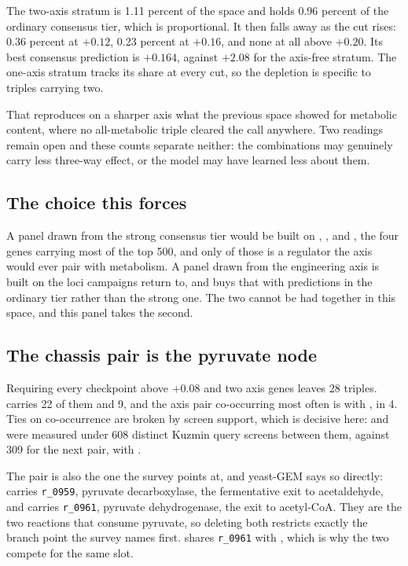 The two-axis stratum is 1.11 percent of the space and holds 0.96 percent of the
ordinary consensus tier, which is proportional. It then falls away as the cut
rises: 0.36 percent at $+0.12$, 0.23 percent at $+0.16$, and none at all above
$+0.20$. Its best consensus prediction is $+0.164$, against $+2.08$ for the
axis-free stratum. The one-axis stratum tracks its share at every cut, so the
depletion is specific to triples carrying two.

That reproduces on a sharper axis what the previous space showed for metabolic
content, where no all-metabolic triple cleared the call anywhere. Two readings
remain open and these counts separate neither: the combinations may genuinely
carry less three-way effect, or the model may have learned less about them.

\subsection{The choice this forces}

A panel drawn from the strong consensus tier would be built on ,
,  and , the four genes carrying most of the top
500, and only  of those is a regulator the axis would ever pair with
metabolism. A panel drawn from the engineering axis is built on the loci
campaigns return to, and buys that with predictions in the ordinary tier rather
than the strong one. The two cannot be had together in this space, and this
panel takes the second.

\subsection{The chassis pair is the pyruvate node}

Requiring every checkpoint above $+0.08$ and two axis genes leaves 28 triples.
 carries 22 of them and  9, and the axis pair co-occurring
most often is  with , in 4. Ties on co-occurrence are broken
by screen support, which is decisive here:  and  were
measured under 608 distinct Kuzmin query screens between them, against 309 for the
next pair,  with .

The pair is also the one the survey points at, and yeast-GEM says so directly:
 carries \texttt{r\_0959}, pyruvate decarboxylase, the fermentative
exit to acetaldehyde, and  carries \texttt{r\_0961}, pyruvate
dehydrogenase, the exit to acetyl-CoA. They are the two reactions that consume
pyruvate, so deleting both restricts exactly the branch point the survey names
first.  shares \texttt{r\_0961} with , which is why the two
compete for the same slot.

